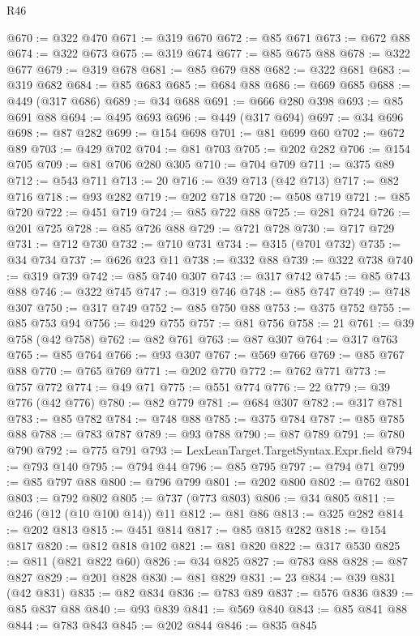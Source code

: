 \begin{lexlean}{R46}
\begin{coremodule}
@670 := @322 @470
@671 := @319 @670
@672 := @85 @671
@673 := @672 @88
@674 := @322 @673
@675 := @319 @674
@677 := @85 @675 @88
@678 := @322 @677
@679 := @319 @678
@681 := @85 @679 @88
@682 := @322 @681
@683 := @319 @682
@684 := @85 @683
@685 := @684 @88
@686 := @669 @685
@688 := @449 (@317 @686)
@689 := @34 @688
@691 := @666 @280 @398
@693 := @85 @691 @88
@694 := @495 @693
@696 := @449 (@317 @694)
@697 := @34 @696
@698 := @87 @282
@699 := @154 @698
@701 := @81 @699 @60
@702 := @672 @89
@703 := @429 @702
@704 := @81 @703
@705 := @202 @282
@706 := @154 @705
@709 := @81 @706 @280 @305
@710 := @704 @709
@711 := @375 @89
@712 := @543 @711
@713 := 20
@716 := @39 @713 (@42 @713)
@717 := @82 @716
@718 := @93 @282
@719 := @202 @718
@720 := @508 @719
@721 := @85 @720
@722 := @451 @719
@724 := @85 @722 @88
@725 := @281 @724
@726 := @201 @725
@728 := @85 @726 @88
@729 := @721 @728
@730 := @717 @729
@731 := @712 @730
@732 := @710 @731
@734 := @315 (@701 @732)
@735 := @34 @734
@737 := @626 @23 @11
@738 := @332 @88
@739 := @322 @738
@740 := @319 @739
@742 := @85 @740 @307
@743 := @317 @742
@745 := @85 @743 @88
@746 := @322 @745
@747 := @319 @746
@748 := @85 @747
@749 := @748 @307
@750 := @317 @749
@752 := @85 @750 @88
@753 := @375 @752
@755 := @85 @753 @94
@756 := @429 @755
@757 := @81 @756
@758 := 21
@761 := @39 @758 (@42 @758)
@762 := @82 @761
@763 := @87 @307
@764 := @317 @763
@765 := @85 @764
@766 := @93 @307
@767 := @569 @766
@769 := @85 @767 @88
@770 := @765 @769
@771 := @202 @770
@772 := @762 @771
@773 := @757 @772
@774 := @49 @71
@775 := @551 @774
@776 := 22
@779 := @39 @776 (@42 @776)
@780 := @82 @779
@781 := @684 @307
@782 := @317 @781
@783 := @85 @782
@784 := @748 @88
@785 := @375 @784
@787 := @85 @785 @88
@788 := @783 @787
@789 := @93 @788
@790 := @87 @789
@791 := @780 @790
@792 := @775 @791
@793 := LexLeanTarget.TargetSyntax.Expr.field
@794 := @793 @140
@795 := @794 @44
@796 := @85 @795
@797 := @794 @71
@799 := @85 @797 @88
@800 := @796 @799
@801 := @202 @800
@802 := @762 @801
@803 := @792 @802
@805 := @737 (@773 @803)
@806 := @34 @805
@811 := @246 (@12 (@10 @100 @14)) @11
@812 := @81 @86
@813 := @325 @282
@814 := @202 @813
@815 := @451 @814
@817 := @85 @815 @282
@818 := @154 @817
@820 := @812 @818 @102
@821 := @81 @820
@822 := @317 @530
@825 := @811 (@821 @822 @60)
@826 := @34 @825
@827 := @783 @88
@828 := @87 @827
@829 := @201 @828
@830 := @81 @829
@831 := 23
@834 := @39 @831 (@42 @831)
@835 := @82 @834
@836 := @783 @89
@837 := @576 @836
@839 := @85 @837 @88
@840 := @93 @839
@841 := @569 @840
@843 := @85 @841 @88
@844 := @783 @843
@845 := @202 @844
@846 := @835 @845

\end{coremodule}
\end{lexlean}
